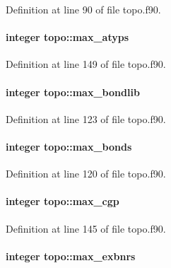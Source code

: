 Definition at line 90 of file topo.\-f90.

\hypertarget{classtopo_ad992e655380f152361aa9d351c59a9f6}{
\paragraph[{max\-\_\-atyps}]{\setlength{\rightskip}{0pt plus 5cm}integer topo\-::max\-\_\-atyps}}\label{classtopo_ad992e655380f152361aa9d351c59a9f6}


Definition at line 149 of file topo.\-f90.

\hypertarget{classtopo_adba79e0b7b7a62d7222fd453ec63aeb6}{
\paragraph[{max\-\_\-bondlib}]{\setlength{\rightskip}{0pt plus 5cm}integer topo\-::max\-\_\-bondlib}}\label{classtopo_adba79e0b7b7a62d7222fd453ec63aeb6}


Definition at line 123 of file topo.\-f90.

\hypertarget{classtopo_a40ede124fdad99eb520cd35353772625}{
\paragraph[{max\-\_\-bonds}]{\setlength{\rightskip}{0pt plus 5cm}integer topo\-::max\-\_\-bonds}}\label{classtopo_a40ede124fdad99eb520cd35353772625}


Definition at line 120 of file topo.\-f90.

\hypertarget{classtopo_af211ad4f3cda0669a497f1e0f2ab3f5e}{
\paragraph[{max\-\_\-cgp}]{\setlength{\rightskip}{0pt plus 5cm}integer topo\-::max\-\_\-cgp}}\label{classtopo_af211ad4f3cda0669a497f1e0f2ab3f5e}


Definition at line 145 of file topo.\-f90.

\hypertarget{classtopo_abc0c05f5412f2af5c5ca0816d3d58ae4}{
\paragraph[{max\-\_\-exbnrs}]{\setlength{\rightskip}{0pt plus 5cm}integer topo\-::max\-\_\-exbnrs}}\label{classtopo_abc0c05f5412f2af5c5ca0816d3d58ae4}


